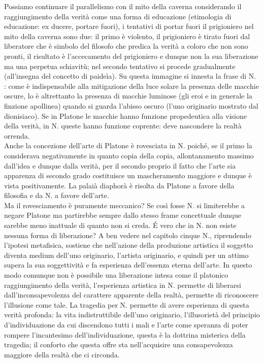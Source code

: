 \documentclass[10pt,a4paper]{article}
\begin{document}
Possiamo continuare il parallelismo con il mito della caverna considerando il raggiungimento della verità come una forma di educazione (etimologia di educazione: ex ducere, portare fuori), i tentativi di portar fuori il prigioniero nel mito della caverna sono due: il primo è violento, il prigioniero è tirato fuori dal liberatore che è simbolo del filosofo che predica la verità a coloro che non sono pronti, il risultato è l'accecamento del prigioniero e dunque non la sua liberazione ma una perpetua schiavitù; nel secondo tentativo si procede gradualmente (all'insegna del concetto di paideìa). Su questa immagine si innesta la frase di N. : come è indispensabile alla mitigazione della luce solare la presenza delle macchie oscure, lo è altrettanto la presenza di macchie luminose (gli eroi e in generale la finzione apollinea) quando si guarda l'abisso oscuro (l'uno originario mostrato dal dionisiaco). Se in Platone le macchie hanno funzione propedeutica alla visione della verità, in N. queste hanno funzione coprente: deve nascondere la realtà orrenda.\\
Anche la concezione dell'arte di Platone è rovesciata in N. poiché, se il primo la considerava negativamente in quanto copia della copia, allontanamento massimo dall'idea e dunque dalla verità, per il secondo proprio il fatto che l'arte sia apparenza di secondo grado costituisce un mascheramento maggiore e dunque è vista positivamente. La palaià diaphorà è risolta da Platone a favore della filosofia e da N. a favore dell'arte.\\
Ma il rovesciamento è puramente meccanico? Se così fosse N. si limiterebbe a negare Platone ma partirebbe sempre dallo stesso frame concettuale dunque sarebbe meno inattuale di quanto non si creda. \'E vero che in N. non esiste nessuna forma di liberazione? A ben vedere nel capitolo cinque N., riprendendo l'ipotesi metafisica, sostiene che nell'azione della produzione artistica il soggetto diventa medium dell'uno originario, l'artista originario, e quindi per un attimo supera la sua soggettività e fa esperienza dell'essenza eterna dell'arte. In questo modo comunque non è possibile una liberazione intesa come il platonico raggiungimento della verità, l'esperienza artistica in N. permette di liberarsi dall'inconsapevolezza del carattere apparente della realtà, permette di riconoscere l'illusione come tale.  La tragedia per N. permette di avere esperienza di questa verità profonda: la vita indistruttibile dell'uno originario, l'illusorietà del principio d'individuazione da cui discendono tutti i mali e l'arte come speranza di poter rompere l'incantesimo dell'individuazione, questa è la dottrina misterica della tragedia; il conforto che questa offre sta nell'acquisire una consapevolezza maggiore della realtà che ci circonda.\\
\end{document}
